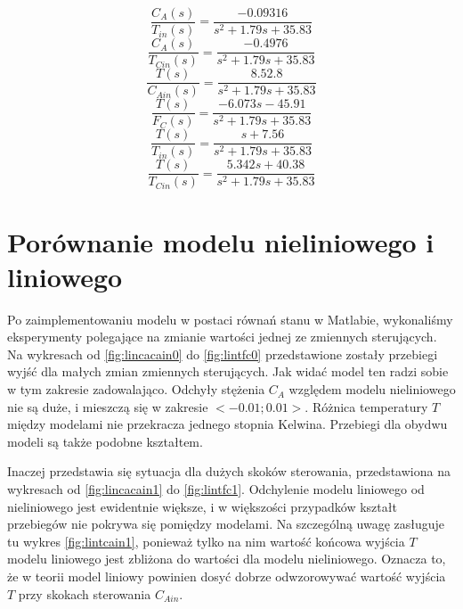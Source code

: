 \begin{equation}
\frac{C_A(s)}{T_{in}(s)} = \frac{-0.09316}{s^2+1.79s+35.83}
\end{equation}
\begin{equation}
\frac{C_A(s)}{T_{Cin}(s)} = \frac{-0.4976}{s^2+1.79s+35.83}
\end{equation}
\begin{equation}
\frac{T(s)}{C_{Ain}(s)} = \frac{8.52.8}{s^2+1.79s+35.83}
\end{equation}
\begin{equation}
\frac{T(s)}{F_C(s)} = \frac{-6.073s-45.91}{s^2+1.79s+35.83}
\end{equation}
\begin{equation}
\frac{T(s)}{T_{in}(s)} = \frac{s + 7.56}{s^2+1.79s+35.83}
\end{equation}
\begin{equation}
\frac{T(s)}{T_{Cin}(s)} = \frac{5.342 s + 40.38}{s^2+1.79s+35.83}
\end{equation}
\newpage
\section{Porównanie modelu nieliniowego i liniowego}
Po zaimplementowaniu modelu w postaci równań stanu w Matlabie, wykonaliśmy eksperymenty polegające na zmianie wartości jednej ze zmiennych sterujących. Na wykresach od \ref{fig:lincacain0} do \ref{fig:lintfc0} przedstawione zostały przebiegi wyjść dla małych zmian zmiennych sterujących. Jak widać model ten radzi sobie w tym zakresie zadowalająco. Odchyły stężenia $C_A$ względem modelu nieliniowego nie są duże, i mieszczą się w zakresie $<-0.01;0.01>$. Różnica temperatury $T$ między modelami nie przekracza jednego stopnia Kelwina. Przebiegi dla obydwu modeli są także podobne kształtem.

Inaczej przedstawia się sytuacja dla dużych skoków sterowania, przedstawiona na wykresach od \ref{fig:lincacain1} do \ref{fig:lintfc1}. Odchylenie modelu liniowego od nieliniowego jest ewidentnie większe, i  w większości przypadków kształt przebiegów nie pokrywa się pomiędzy modelami. Na szczególną uwagę zasługuje tu wykres \ref{fig:lintcain1}, ponieważ tylko na nim wartość końcowa wyjścia $T$ modelu liniowego jest zbliżona do wartości dla modelu nieliniowego. Oznacza to, że w teorii model liniowy powinien dosyć dobrze odwzorowywać wartość wyjścia $T$ przy skokach sterowania $C_{Ain}$.

